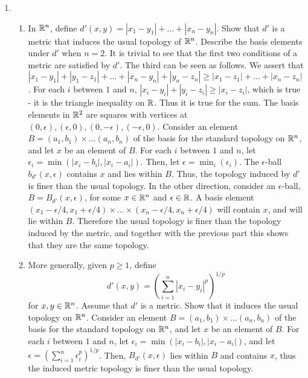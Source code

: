 \documentclass[12pt,letterpaper]{article}
\begin{document}
\RaggedRight
\begin{enumerate}
  \item \begin{enumerate}
    \item In $\mathbb{R}^n$, define $d'(x,y)=|x_1-y_1|+\dots +|x_n-y_n|$. Show that $d'$ is a metric that induces the usual topology of $\mathbb{R}^n$. Describe the basis elements under $d'$ when $n=2$.\hspace{5in}\n
    \indent It is trivial to see that the first two conditions of a metric are satisfied by $d'$. The third can be seen as follows. We assert that $|x_1-y_1|+|y_1-z_1|+\dots + |x_n-y_n|+|y_n-z_n| \geq |x_1-z_1|+\dots + |x_n-z_n|$. For each $i$ between $1$ and $n$, $|x_i-y_i| + |y_i-z_i| \geq |x_i-z_i|$, which is true - it is the triangle inequality on $\mathbb{R}$. Thus it is true for the sum.\hspace{5in}\n
    \indent The basis elements in $\mathbb{R}^2$ are squares with vertices at $(0,\epsilon), (\epsilon, 0), (0,-\epsilon), (-\epsilon,0)$. \hspace{5in}\n
    \indent Consider an element $B=(a_1,b_1)\times\dots (a_n,b_n)$ of the basis for the standard topology on $\mathbb{R}^n$, and let $x$ be an element of $B$. For each $i$ between $1$ and $n$, let $\epsilon_i=\min(|x_i-b_i|, |x_i-a_i|)$. Then, let $\epsilon = \min_i(\epsilon_i)$. The $\epsilon$-ball $b_{d'}(x,\epsilon)$ contains $x$ and lies within $B$. Thus, the topology induced by $d'$ is finer than the usual topology. \hspace{5in}\n
    \indent In the other direction, consider an $\epsilon$-ball, $B=B_{d'}(x,\epsilon)$, for some $x\in \mathbb{R}^n$ and $\epsilon \in \mathbb{R}$. A basis element $(x_1-\epsilon/4, x_1+\epsilon/4)\times\dots \times (x_n-\epsilon/4, x_n+\epsilon/4)$ will contain $x$, and will lie within $B$. Therefore the usual topology is finer than the topology induced by the metric, and together with the previous part this shows that they are the same topology.
    \item More generally, given $p\geq 1$, define $$d'(x,y)=\left(\sum_{i=1}^n|x_i-y_i|^p\right)^{1/p}$$ for $x,y\in \mathbb{R}^n$. Assume that $d'$ is a metric. Show that it induces the usual topology on $\mathbb{R}^n$.\hspace{5in}\n
    \indent Consider an element $B=(a_1,b_1)\times\dots (a_n,b_n)$ of the basis for the standard topology on $\mathbb{R}^n$, and let $x$ be an element of $B$. For each $i$ between $1$ and $n$, let $\epsilon_i=\min(|x_i-b_i|,|x_i-a_i|)$, and let $\epsilon = \left(\displaystyle\sum_{i=1}^{n}\epsilon_i^p\right)^{1/p}$. Then, $B_{d'}(x,\epsilon)$ lies within $B$ and contains $x$, thus the induced metric topology is finer than the usual topology. \hspace{5in}\n

\end{enumerate}
\end{enumerate}
\end{document}

